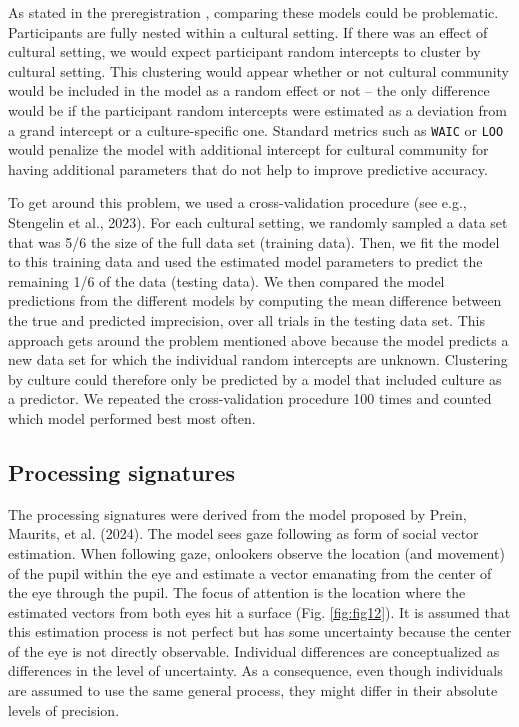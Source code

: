 \documentclass[
  man,floatsintext]{apa7}
\begin{document}
As stated in the preregistration , comparing these models could be problematic. Participants are fully nested within a cultural setting. If there was an effect of cultural setting, we would expect participant random intercepts to cluster by cultural setting. This clustering would appear whether or not cultural community would be included in the model as a random effect or not -- the only difference would be if the participant random intercepts were estimated as a deviation from a grand intercept or a culture-specific one. Standard metrics such as \texttt{WAIC} or \texttt{LOO} would penalize the model with additional intercept for cultural community for having additional parameters that do not help to improve predictive accuracy.

To get around this problem, we used a cross-validation procedure (see e.g., Stengelin et al., 2023). For each cultural setting, we randomly sampled a data set that was 5/6 the size of the full data set (training data). Then, we fit the model to this training data and used the estimated model parameters to predict the remaining 1/6 of the data (testing data). We then compared the model predictions from the different models by computing the mean difference between the true and predicted imprecision, over all trials in the testing data set. This approach gets around the problem mentioned above because the model predicts a new data set for which the individual random intercepts are unknown. Clustering by culture could therefore only be predicted by a model that included culture as a predictor. We repeated the cross-validation procedure 100 times and counted which model performed best most often.

\hypertarget{processing-signatures}{%
\subsection{Processing signatures}\label{processing-signatures}}

The processing signatures were derived from the model proposed by Prein, Maurits, et al. (2024). The model sees gaze following as form of social vector estimation. When following gaze, onlookers observe the location (and movement) of the pupil within the eye and estimate a vector emanating from the center of the eye through the pupil. The focus of attention is the location where the estimated vectors from both eyes hit a surface (Fig. \ref{fig:fig12}). It is assumed that this estimation process is not perfect but has some uncertainty because the center of the eye is not directly observable. Individual differences are conceptualized as differences in the level of uncertainty. As a consequence, even though individuals are assumed to use the same general process, they might differ in their absolute levels of precision.
\end{document}
